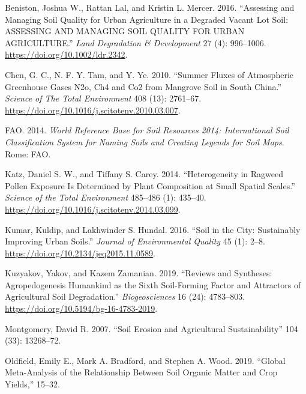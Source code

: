 \documentclass[
]{article}
\newlength{\cslhangindent}
\newlength{\cslentryspacingunit} %
\newenvironment{CSLReferences}[2] %
 {%
  \setlength{\parindent}{0pt}
  \ifodd #1
  \let\oldpar\par
  \def\par{\hangindent=\cslhangindent\oldpar}
  \fi
  \setlength{\parskip}{#2\cslentryspacingunit}
 }%
 {}
\begin{document}
\hypertarget{refs}{}
\begin{CSLReferences}{1}{0}
\leavevmode{}%
Beniston, Joshua W., Rattan Lal, and Kristin L. Mercer. 2016. {``Assessing and {Managing Soil Quality} for {Urban Agriculture} in a {Degraded Vacant Lot Soil}: {ASSESSING AND MANAGING SOIL QUALITY FOR URBAN AGRICULTURE}.''} \emph{Land Degradation \& Development} 27 (4): 996--1006. \url{https://doi.org/10.1002/ldr.2342}.

\leavevmode{}%
Chen, G. C., N. F. Y. Tam, and Y. Ye. 2010. {``Summer Fluxes of Atmospheric Greenhouse Gases {N2o}, {Ch4} and {Co2} from Mangrove Soil in {South China}.''} \emph{Science of The Total Environment} 408 (13): 2761--67. \url{https://doi.org/10.1016/j.scitotenv.2010.03.007}.

\leavevmode{}%
FAO. 2014. \emph{World Reference Base for Soil Resources 2014: International Soil Classification System for Naming Soils and Creating Legends for Soil Maps}. {Rome}: {FAO}.

\leavevmode{}%
Katz, Daniel S. W., and Tiffany S. Carey. 2014. {``Heterogeneity in Ragweed Pollen Exposure Is Determined by Plant Composition at Small Spatial Scales.''} \emph{Science of the Total Environment} 485--486 (1): 435--40. \url{https://doi.org/10.1016/j.scitotenv.2014.03.099}.

\leavevmode{}%
Kumar, Kuldip, and Lakhwinder S. Hundal. 2016. {``Soil in the {City}: {Sustainably Improving Urban Soils}.''} \emph{Journal of Environmental Quality} 45 (1): 2--8. \url{https://doi.org/10.2134/jeq2015.11.0589}.

\leavevmode{}%
Kuzyakov, Yakov, and Kazem Zamanian. 2019. {``Reviews and Syntheses: {Agropedogenesis} \textendash{} Humankind as the Sixth Soil-Forming Factor and Attractors of Agricultural Soil Degradation.''} \emph{Biogeosciences} 16 (24): 4783--803. \url{https://doi.org/10.5194/bg-16-4783-2019}.

\leavevmode{}%
Montgomery, David R. 2007. {``Soil Erosion and Agricultural Sustainability''} 104 (33): 13268--72.

\leavevmode{}%
Oldfield, Emily E., Mark A. Bradford, and Stephen A. Wood. 2019. {``Global Meta-Analysis of the Relationship Between Soil Organic Matter and Crop Yields,''} 15--32.


\end{CSLReferences}
\end{document}
